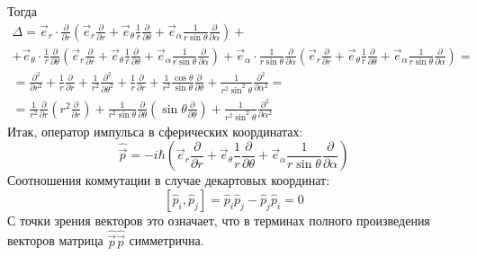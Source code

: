 Тогда
\[
	\begin{gathered}
		\Delta = 
		\vec{e}_r\cdot \frac{\partial}{\partial r} 
		\left(\vec{e}_r \frac{\partial}{\partial r} + \vec{e}_\theta \frac{1}{r}\frac{\partial}{\partial \theta} + \vec{e}_\alpha \frac{1}{r \sin \theta}\frac{\partial}{\partial \alpha}\right)
		+ \\ +
		\vec{e}_\theta\cdot \frac{1}{r}\frac{\partial}{\partial \theta}
		\left(\vec{e}_r \frac{\partial}{\partial r} + \vec{e}_\theta \frac{1}{r}\frac{\partial}{\partial \theta} + \vec{e}_\alpha \frac{1}{r \sin \theta}\frac{\partial}{\partial \alpha}\right)
		+
		\vec{e}_\alpha\cdot \frac{1}{r \sin \theta}\frac{\partial}{\partial \alpha}
		\left(\vec{e}_r \frac{\partial}{\partial r} + \vec{e}_\theta \frac{1}{r}\frac{\partial}{\partial \theta} + \vec{e}_\alpha \frac{1}{r \sin \theta}\frac{\partial}{\partial \alpha}\right) 
		= \\ =
		\frac{\partial^2}{\partial r^2} +
		\frac{1}{r} \frac{\partial}{\partial r} +
		\frac{1}{r^2} \frac{\partial^2}{\partial \theta^2} +
		\frac{1}{r} \frac{\partial}{\partial r} +
		\frac{1}{r^2} \frac{\cos \theta}{\sin \theta} \frac{\partial}{\partial \theta} +
		\frac{1}{r^2 \sin^2 \theta} \frac{\partial^2}{\partial \alpha^2}
		= \\ =
		\frac{1}{r^2}\frac{\partial}{\partial r} \left(r^2 \frac{\partial}{\partial r}\right)
		+ \frac{1}{r^2 \sin \theta} \frac{\partial}{\partial \theta} \left(\sin \theta \frac{\partial}{\partial \theta}\right)
		+ \frac{1}{r^2 \sin^2 \theta} \frac{\partial^2}{\partial \alpha^2}
	\end{gathered}
\]
Итак, оператор импульса в сферических координатах:
\[
	\hat{\vec{p}} = -i\hbar \left(\vec{e}_r \frac{\partial}{\partial r} + \vec{e}_\theta \frac{1}{r}\frac{\partial}{\partial \theta} + \vec{e}_\alpha \frac{1}{r \sin \theta}\frac{\partial}{\partial \alpha} \right)
\]
Соотношения коммутации в случае декартовых координат:
\[
	[\hat{p}_i, \hat{p}_j] = \hat{p}_i \hat{p}_j - \hat{p}_j \hat{p}_i = 0
\]
С точки зрения векторов это означает, что в терминах полного произведения векторов матрица $\hat{\vec{p}}\hat{\vec{p}}$ симметрична.
